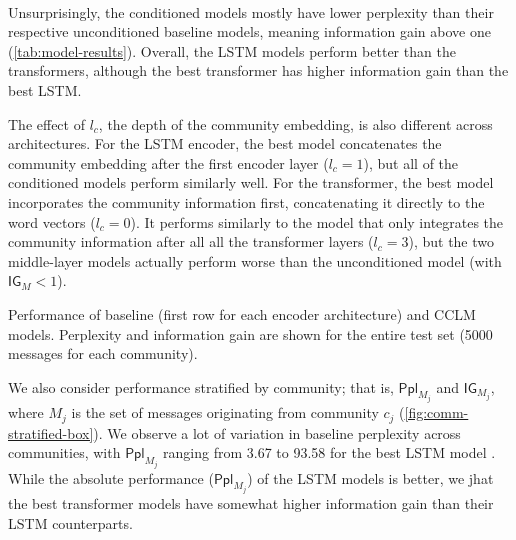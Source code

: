 \documentclass[11pt]{article}
\newcommand\Ppl{\mathsf{Ppl}}
\newcommand\IG{\mathsf{IG}}
\begin{document}
\paragraph{}

Unsurprisingly, the conditioned models mostly have lower perplexity 
than their respective unconditioned baseline models, 
meaning information gain above one (\cref{tab:model-results}).
Overall, the LSTM models perform better than the transformers, 
although the best transformer has higher information gain than the best LSTM.

The effect of $l_c$, the depth of the community embedding,
is also different across architectures.
For the LSTM encoder, 
the best model concatenates the community embedding after the first encoder layer ($l_c=1$),
but all of the conditioned models perform similarly well.
For the transformer, the best model incorporates the community information
first, concatenating it directly to the word vectors ($l_c=0$).
It performs similarly to the model that only integrates the community information
after all all the transformer layers ($l_c=3$),
but the two middle-layer models actually perform worse than the unconditioned model
(with $\IG_M < 1$).

\begin{table}
  \small
  \centering
  
  \caption{
    Performance of baseline (first row for each encoder architecture) and CCLM models. 
    Perplexity and information gain are shown for the entire test set 
    (\num{5000} messages for each community).}
  \label{tab:model-results}
\end{table}

We also consider performance stratified by community; that is,
$\Ppl_{M_j}$ and $\IG_{M_j}$, 
where $M_j$ is the set of messages originating from community $c_j$ 
(\cref{fig:comm-stratified-box}).
We observe a lot of variation in baseline perplexity
across communities, with $\Ppl_{M_j}$ ranging from \num{3.67} to
\num{93.58} for the best LSTM model . %
While the absolute performance ($\Ppl_{M_j}$) of the LSTM models is better,
we jhat the best transformer models have somewhat higher information gain
than their LSTM counterparts.
\end{document}
